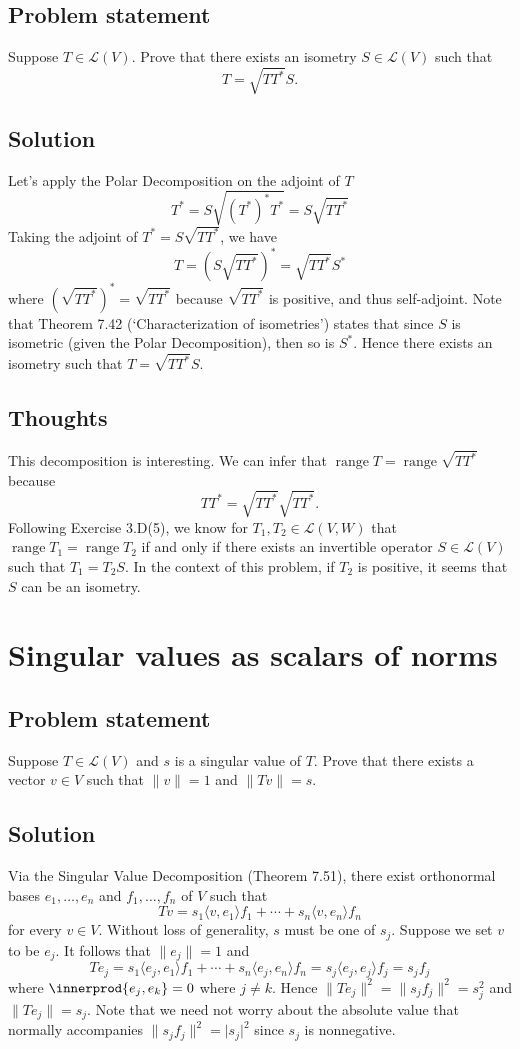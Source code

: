 \documentclass{article}
\providecommand{\abs}[1]{\lvert#1\rvert} \providecommand{\norm}[1]{\lVert#1\rVert}
\DeclarePairedDelimiter{\innerprod}\langle\rangle
\begin{document}
\subsection*{Problem statement}
Suppose $T\in\mathcal{L}(V)$. Prove that there exists an isometry $S\in\mathcal{L}(V)$ such that 
\[T=\sqrt{TT^*}S.\]

\subsection*{Solution}
Let's apply the Polar Decomposition on the adjoint of $T$
\[T^*=S\sqrt{(T^*)^*T^*}=S\sqrt{TT^*}\]
Taking the adjoint of $T^*=S\sqrt{TT^*}$, we have
\[T=(S\sqrt{TT^*})^*=\sqrt{TT^*}S^*\]
where $(\sqrt{TT^*})^*=\sqrt{TT^*}$ because $\sqrt{TT^*}$ is positive, and thus self-adjoint. Note that Theorem 7.42 (`Characterization of isometries') states that since $S$ is isometric (given the Polar Decomposition), then so is $S^*$. Hence there exists an isometry such that $T=\sqrt{TT^*}S$.

\subsection*{Thoughts}
This decomposition is interesting. We can infer that $\operatorname{range}T=\operatorname{range}\sqrt{TT^*}$ because
\[TT^*=\sqrt{TT^*}\sqrt{TT^*}.\]
Following Exercise 3.D(5), we know for $T_1,T_2\in\mathcal{L}(V,W)$ that $\operatorname{range}T_1=\operatorname{range}T_2$ if and only if there exists an invertible operator $S\in\mathcal{L}(V)$ such that $T_1=T_2S$. In the context of this problem, if $T_2$ is positive, it seems that $S$ can be an isometry.

\clearpage

\section{Singular values as scalars of norms}
\subsection*{Problem statement}
Suppose $T\in\mathcal{L}(V)$ and $s$ is a singular value of $T$. Prove that there exists a vector $v\in V$ such that $\norm{v}=1$ and $\norm{Tv}=s$.

\subsection*{Solution}
Via the Singular Value Decomposition (Theorem 7.51), there exist orthonormal bases $e_1,\ldots,e_n$ and $f_1,\ldots,f_n$ of $V$ such that
\[Tv=s_1\langle v,e_1\rangle f_1+\cdots +s_n\langle v,e_n\rangle f_n\]
for every $v\in V$. Without loss of generality, $s$ must be one of $s_j$. Suppose we set $v$ to be $e_j$. It follows that $\norm{e_j}=1$ and 
\[Te_j=s_1\langle e_j,e_1\rangle f_1+\cdots +s_n\langle e_j,e_n\rangle f_n=s_j\langle e_j,e_j\rangle f_j=s_jf_j\]
where $\innerprod{e_j,e_k}=0$ where $j\neq k$. Hence $\norm{Te_j}^2=\norm{s_jf_j}^2=s_j^2$ and $\norm{Te_j}=s_j$. Note that we need not worry about the absolute value that normally accompanies $\norm{s_jf_j}^2=\abs{s_j}^2$ since $s_j$ is nonnegative.
\end{document}
